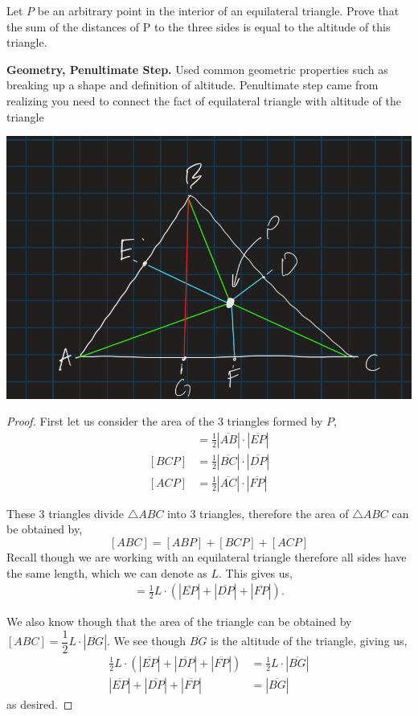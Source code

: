 \documentclass[11pt]{article}
\newenvironment{problem}[2][Problem\!]{\begin{trivlist}
\item[\hskip \labelsep {\bfseries #1}\hskip \labelsep {\bfseries #2}]}{\end{trivlist}}
\newcommand{\abs}[1]{\left\lvert#1\right\rvert} %
\begin{document}
\begin{tcolorbox}
    \begin{problem} {IC | 11/17 | 153.}
       Let $P$ be an arbitrary point in the interior of an equilateral triangle. Prove that the sum of the distances of P to the three sides is equal to the altitude of this triangle.
    \end{problem}
    \textbf{Geometry, Penultimate Step. } Used common geometric properties such as breaking up a shape and definition of altitude. Penultimate step came from realizing you need to connect the fact of equilateral triangle with altitude of the triangle 
\end{tcolorbox}
\includegraphics[scale= .5]{prob3}
\begin{proof} \newcommand{\leng}[1]{\abs{\overline{#1}}}
    First let us consider the area of the 3 triangles formed by $P$, 
    \begin{align*}
        [ABP] &= \frac{1}{2} \leng{AB} \cdot \leng{EP} \\
        [BCP] &= \frac{1}{2} \leng{BC} \cdot \leng{DP} \\
        [ACP] &= \frac{1}{2} \leng{AC} \cdot \leng{FP}
    \end{align*}

    These 3 triangles divide $\triangle ABC$ into 3 triangles, therefore the area of $\triangle ABC$ can be obtained by,
    \[[ABC] = [ABP] + [BCP] + [ACP]\]
    Recall though we are working with an equilateral triangle therefore all sides have the same length, which we can denote as $L$. This gives us,
    \begin{align*}
        [ABC] = \frac{1}{2} L \cdot (\leng{EP} + \leng{DP} +\leng{FP}).
    \end{align*}

    We also know though that the area of the triangle can be obtained by $[ABC] = \dfrac{1}{2} L \cdot \leng{BG}$. We see though $\overline{BG}$ is the altitude of the triangle, giving us, 
    \begin{align*}
        \frac{1}{2} L \cdot (\leng{EP} + \leng{DP} +\leng{FP}) &= \frac{1}{2} L \cdot \leng{BG} \\
        \leng{EP} + \leng{DP} +\leng{FP} &= \leng{BG}
    \end{align*}
    as desired.
\end{proof}
\end{document}

